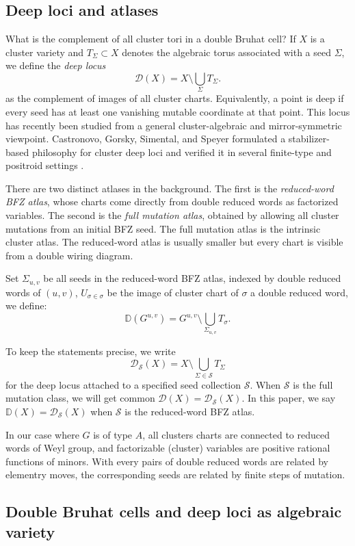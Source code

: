 \documentclass[12pt]{amsart}
\newcommand{\D}{\mathbb D}
\newcommand{\cS}{\mathcal S}
\newcommand{\cD}{\mathcal D}
\theoremstyle{plain}
\theoremstyle{definition}
\theoremstyle{remark}
\begin{document}
\subsection{Deep loci and atlases}

What is the complement of all cluster tori in a double Bruhat cell? If $X$ is a cluster variety and $T_\Sigma\subset X$ denotes the algebraic torus associated with a seed $\Sigma$, we define the \emph{deep locus}
\[
   \cD(X)=X\setminus \bigcup_\Sigma T_\Sigma.
\]
 as the complement of images of all cluster charts. Equivalently, a point is deep if every seed has at least one vanishing mutable coordinate at that point.  This locus has recently been studied from a general cluster-algebraic and mirror-symmetric viewpoint. Castronovo, Gorsky, Simental, and Speyer formulated a stabilizer-based philosophy for cluster deep loci and verified it in several finite-type and positroid settings \cite{CGSS24}. 


There are two distinct atlases in the background.  The first is the \emph{reduced-word BFZ atlas}, whose charts come directly from double reduced words as factorized variables.  The second is the \emph{full mutation atlas}, obtained by allowing all cluster mutations from an initial BFZ seed.  The full mutation atlas is the intrinsic cluster atlas.  The reduced-word atlas is usually smaller but every chart is visible from a double wiring diagram. 

Set $\Sigma_{u,v}$ be all seeds in the reduced-word BFZ atlas, indexed by double reduced words of $(u,v)$, $U_{\sigma \in \sigma}$ be the image of cluster chart of $\sigma$ a double reduced word, we define: 
\[
   \D(G^{u,v})=G^{u,v} \setminus \bigcup_{\Sigma_{u,v}} T_\sigma.
\]

 To keep the statements precise, we write
\[
   \cD_{\cS}(X)=X\setminus\bigcup_{\Sigma\in\cS}T_\Sigma
\]
for the deep locus attached to a specified seed collection $\cS$.  When $\cS$ is the full mutation class, we will get common $\cD(X)=\cD_{\cS}(X)$. In this paper, we say $\D(X)=\cD_{\cS}(X)$ when $\cS$ is the reduced-word BFZ atlas.

In our case where $G$ is of type $A$, all clusters charts are connected to reduced words of Weyl group, and factorizable (cluster) variables are positive rational functions of minors. With every pairs of double reduced words are related by elementry moves, the corresponding seeds are related by finite steps of mutation. 

\subsection{Double Bruhat cells and deep loci as algebraic variety}
\end{document}
